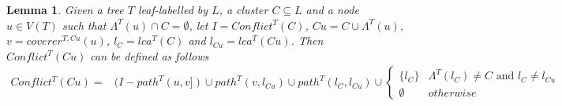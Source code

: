 \documentclass[final,1p,times]{elsarticle}
\newcommand{\leafset}{\Lambda}
\newtheorem{lemma}[theorem]{Lemma}
\begin{document}
    \begin{lemma}
        \label{lem:incompatibilityrecursive}
        Given a tree $T$ leaf-labelled by $L$, a cluster $C \subseteq L$ and a node $u \in V(T)$ such that $\leafset^{T}(u) \cap C = \emptyset$, let $I = Conflict^{T}(C)$, $Cu = C \cup \leafset^{T}(u)$, $v = coverer^{T, Cu}(u)$, $l_C = lca^{T}(C)$ and $l_{Cu} = lca^{T}(Cu)$. Then $Conflict^{T}(Cu)$ can be defined as follows
        \begin{align*}
            Conflict^{T}(Cu) = &(I - path^{T}(u, v]) \cup path^{T}(v, l_{Cu}) \cup path^{T}(l_C, l_{Cu}) \cup
            \begin{cases}
                \{l_C\} & \leafset^{T}(l_C) \neq C \text{ and } l_C \neq l_{Cu}\\
                \emptyset & otherwise
            \end{cases}
        \end{align*}
    \end{lemma}
\end{document}
